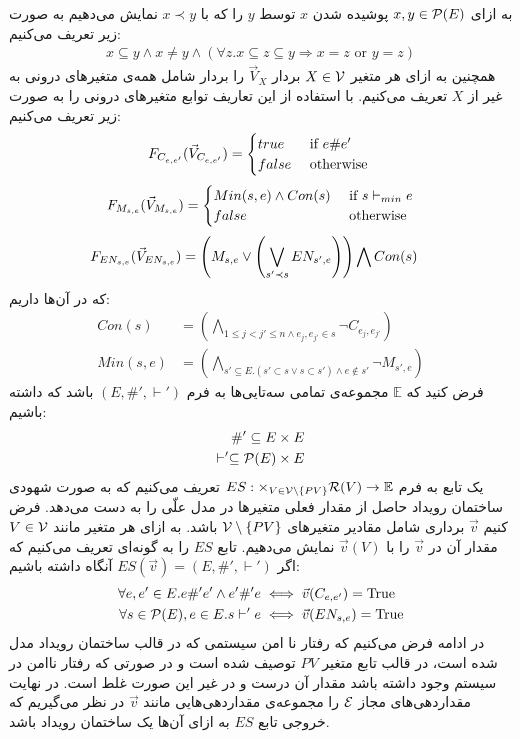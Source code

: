 به ازای
$x,y \in \mathcal{P}(E)$
پوشیده
شدن%
$x$
توسط
$y$
را که با
$x \prec y$
نمایش می‌دهیم به صورت زیر تعریف می‌کنیم:
\begin{align*}
    x \subseteq y \wedge x \neq y \wedge
    (\forall z. x \subseteq z \subseteq y \Rightarrow x = z
    \text{ or } y = z)
\end{align*}
همچنین به ازای هر متغیر
$X \in \mathcal{V}$
بردار
$\vec V_X$
را بردار شامل همه‌ی متغیر‌های درونی به غیر از
$X$
تعریف می‌کنیم.
با استفاده از این تعاریف
توابع متغیر‌های درونی را به صورت زیر تعریف می‌کنیم:
$$
    F_{C_{e,e'}}(\vec V_{C_{e,e'}}) = \begin{cases}
        true  & \text{ if } e \# e' \\
        false & \text{ otherwise }
    \end{cases}
$$
$$
    F_{M_{s,e}}(\vec V_{M_{s,e}}) = \begin{cases}
        Min(s,e) \wedge Con(s) & \text{ if } s \vdash_{min} e \\
        false                  & \text{ otherwise }
    \end{cases}
$$
\begin{align*}
    F_{EN_{s,e}}(\vec V_{EN_{s,e}}) & =
    \left(
    M_{s,e} \vee
    \left(
    \bigvee_{s'\prec s}EN_{s',e}
    \right)
    \right)
    \bigwedge
    Con(s)
\end{align*}
که در آن‌ها داریم:
\begin{align*}
    Con(s)   & =   \left(
    \bigwedge_{ 1\leq j<j' \leq n \wedge e_j,e_{j'} \in s}
    \neg C_{e_j,e_{j'}}
    \right)               \\
    Min(s,e) & = \left(
    \bigwedge_{s' \subseteq E. (s' \subset s \vee s \subset s')
        \wedge e \notin s'}
    \neg M_{s',e}
    \right)
\end{align*}
فرض کنید که
$\mathbb{E}$
مجموعه‌ی تمامی سه‌تایی‌ها به فرم
$(E,\#',\vdash')$
باشد که داشته باشیم:
\begin{align*}
    \#' \subseteq E \times E \\
    \vdash' \subseteq \mathcal{P}(E)\times E
\end{align*}
یک تابع به فرم
$ES: \times_{V \in \mathcal{V}\setminus \{PV\}} \mathcal{R}(V) \rightarrow \mathbb{E}$
تعریف می‌کنیم که به صورت شهودی ساختمان رویداد حاصل از مقدار فعلی متغیر‌ها در مدل علّی را به دست می‌دهد.
فرض کنیم
$\vec v$
برداری شامل مقادیر متغیرهای
$\mathcal{V} \setminus \{PV\}$
باشد.
به ازای هر متغیر مانند
$V \in \mathcal{V}$
مقدار آن در
$\vec v$
را با
$\vec v(V)$
نمایش می‌دهیم.
تابع
$ES$
را به گونه‌ای تعریف می‌کنیم که اگر
$ES(\vec v) = (E,\#',\vdash')$
آنگاه داشته باشیم:
\begin{align*}
    \forall e,e' \in E. e \#' e' \wedge e' \#' e
     & \iff \vec{v}(C_{e,e'}) = \mathrm{True} \\
    \forall s \in \mathcal{P}(E), e \in E.  s \vdash' e
     & \iff \vec{v}(EN_{s,e}) = \mathrm{True}
\end{align*}
در ادامه فرض می‌کنیم که رفتار نا‌ امن%
سیستمی که در قالب ساختمان رویداد مدل شده است، در قالب تابع متغیر
$PV$
توصیف شده است و در صورتی که رفتار نا‌امن در سیستم وجود داشته باشد مقدار آن درست و در غیر این صورت غلط است.
در نهایت مقداردهی‌های مجاز
$\mathcal{E}$
را مجموعه‌ی مقداردهی‌هایی مانند
$\vec v$
در نظر می‌گیریم که خروجی تابع
$ES$
به ازای آن‌ها یک ساختمان رویداد باشد.


